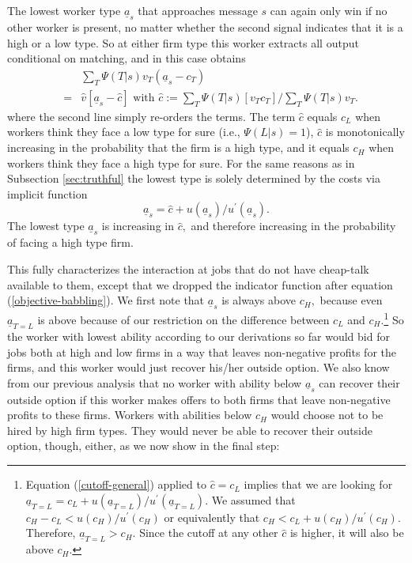 \documentclass[12pt]{article}
\begin{document}
The lowest worker type $\underline{a}_{s}$ that approaches message $s$ can
again only win if no other worker is present, no matter whether the second
signal indicates that it is a high or a low type. So at either firm type
this worker extracts all output conditional on matching, and in this case
obtains 
\begin{eqnarray*}
&&\sum_{T}\Psi (T|s)v_{T}(\underline{a}_{s}-c_{T}) \\
&=&\widehat{v}[\underline{a}_{s}-\widehat{c}]\text{ with }\widehat{c}%
:=\sum_{T}\Psi (T|s)[v_{T}c_{T}]/\sum_{T}\Psi (T|s)v_{T}.
\end{eqnarray*}%
where the second line simply re-orders the terms. The term $\widehat{c}$
equals $c_{L}$ when workers think they face a low type for sure (i.e., $\Psi
(L|s)=1$), $\widehat{c}$ is monotonically increasing in the probability that
the firm is a high type, and it equals $c_{H}$ when workers think they face
a high type for sure. For the same reasons as in Subsection \ref{sec:truthful}
the lowest type is solely determined by the costs via implicit function 
\begin{equation}
\underline{a}_{s}=\widehat{c}+u(\underline{a}_{s})/u^{\prime }(\underline{a}%
_{s}).  \label{cutoff-general}
\end{equation}%
The lowest type $\underline{a}_{s}$ is increasing in $\widehat{c},$ and
therefore increasing in the probability of facing a high type firm.

This fully characterizes the interaction at jobs that do not have cheap-talk
available to them, except that we dropped the indicator function after
equation (\ref{objective-babbling}). We first note that $\underline{a}_{s}$
is always above $c_{H},$ because even $\underline{a}_{T=L}$ is above because
of our restriction on the difference between $c_{L}$ and $c_{H}.$\footnote{%
Equation (\ref{cutoff-general}) applied to $\widehat{c}=c_{L}$ implies that
we are looking for $\underline{a}_{T=L}=c_{L}+u(\underline{a}%
_{T=L})/u^{\prime }(\underline{a}_{T=L}).$ We assumed that $%
c_{H}-c_{L}<u(c_{H})/u^{\prime }(c_{H})$ or equivalently that $%
c_{H}<c_{L}+u(c_{H})/u^{\prime }(c_{H}).$ Therefore, $\underline{a}%
_{T=L}>c_{H}.$ Since the cutoff at any other $\widehat{c}$ is higher, it
will also be above $c_{H}.$} So the worker with lowest ability according to
our derivations so far would bid for jobs both at high and low firms in a
way that leaves non-negative profits for the firms, and this worker would
just recover his/her outside option. We also know from our previous analysis
that no worker with ability below $\underline{a}_{s}$ can recover their
outside option if this worker makes offers to both firms that leave
non-negative profits to these firms. Workers with abilities below $c_{H}$
would choose not to be hired by high firm types. They would never be able to
recover their outside option, though, either, as we now show in the final
step:
\end{document}
